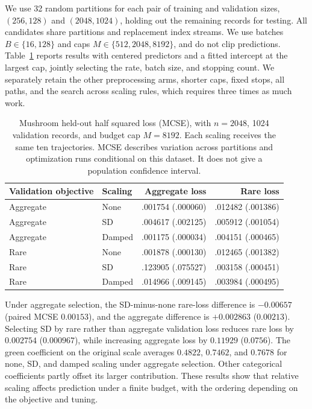 We use 32 random partitions for each pair of training and validation sizes,
$(256,128)$ and $(2048,1024)$, holding out the remaining records for testing.
All candidates share partitions and replacement index streams. We use batches
$B \in \{16,128\}$ and caps $M \in \{512,2048,8192\}$, and do not clip
predictions. Table~\ref{tab:practical} reports results with centered predictors
and a fitted intercept at the largest cap, jointly selecting the rate, batch
size, and stopping count. We separately retain the other preprocessing arms,
shorter caps, fixed stops, all paths, and the search across scaling rules, which
requires three times as much work.

\begin{table}[t]
  \centering
  \small
  \begin{tabular}{llrr}
    \toprule
    Validation objective & Scaling &    Aggregate loss &         Rare loss \\
    \midrule
    Aggregate            & None    & .001754 (.000060) & .012482 (.001386) \\
    Aggregate            & SD      & .004617 (.002125) & .005912 (.001054) \\
    Aggregate            & Damped  & .001175 (.000034) & .004151 (.000465) \\
    Rare                 & None    & .001878 (.000130) & .012465 (.001382) \\
    Rare                 & SD      & .123905 (.075527) & .003158 (.000451) \\
    Rare                 & Damped  & .014966 (.009145) & .003984 (.000495) \\
    \bottomrule
  \end{tabular}
  \caption{
    Mushroom held-out half squared loss (MCSE), with $n = 2048$, 1024 validation
    records, and budget cap $M = 8192$. Each scaling receives the same ten
    trajectories. MCSE describes variation across partitions and optimization
    runs conditional on this dataset. It does not give a population confidence
    interval.
  }
  \label{tab:practical}
\end{table}

Under aggregate selection, the SD-minus-none rare-loss difference is $-0.00657$
(paired MCSE $0.00153$), and the aggregate difference is $+0.002863$
($0.00213$). Selecting SD by rare rather than aggregate validation loss reduces
rare loss by $0.002754$ ($0.000967$), while increasing aggregate loss by
$0.11929$ ($0.0756$). The green coefficient on the original scale averages
$0.4822$, $0.7462$, and $0.7678$ for none, SD, and damped scaling under
aggregate selection. Other categorical coefficients partly offset its larger
contribution. These results show that relative scaling affects prediction under
a finite budget, with the ordering depending on the objective and tuning.

